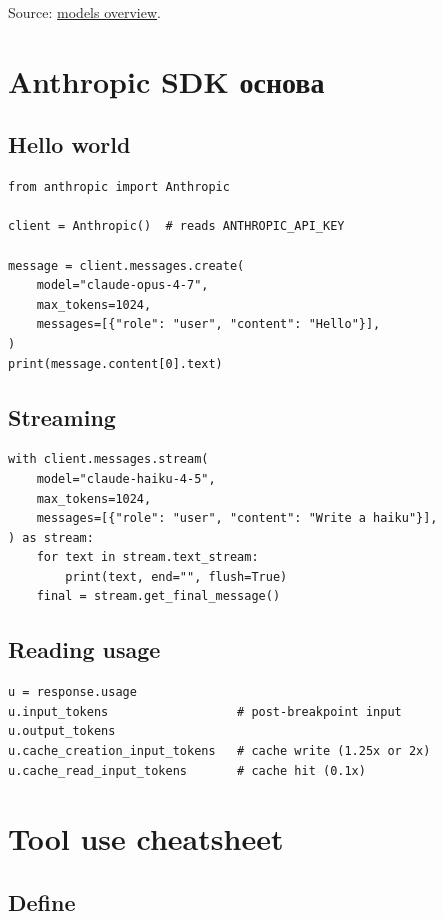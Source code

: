 \documentclass[11pt,a4paper]{article}
\begin{document}
Source: \href{https://docs.claude.com/en/about-claude/models/overview}{models overview}.

\section{Anthropic SDK основа}

\subsection{Hello world}

\begin{lstlisting}[language=python2]
from anthropic import Anthropic

client = Anthropic()  # reads ANTHROPIC_API_KEY

message = client.messages.create(
    model="claude-opus-4-7",
    max_tokens=1024,
    messages=[{"role": "user", "content": "Hello"}],
)
print(message.content[0].text)
\end{lstlisting}

\subsection{Streaming}

\begin{lstlisting}[language=python2]
with client.messages.stream(
    model="claude-haiku-4-5",
    max_tokens=1024,
    messages=[{"role": "user", "content": "Write a haiku"}],
) as stream:
    for text in stream.text_stream:
        print(text, end="", flush=True)
    final = stream.get_final_message()
\end{lstlisting}

\subsection{Reading usage}

\begin{lstlisting}[language=python2]
u = response.usage
u.input_tokens                  # post-breakpoint input
u.output_tokens
u.cache_creation_input_tokens   # cache write (1.25x or 2x)
u.cache_read_input_tokens       # cache hit (0.1x)
\end{lstlisting}

\section{Tool use cheatsheet}

\subsection{Define}
\end{document}
